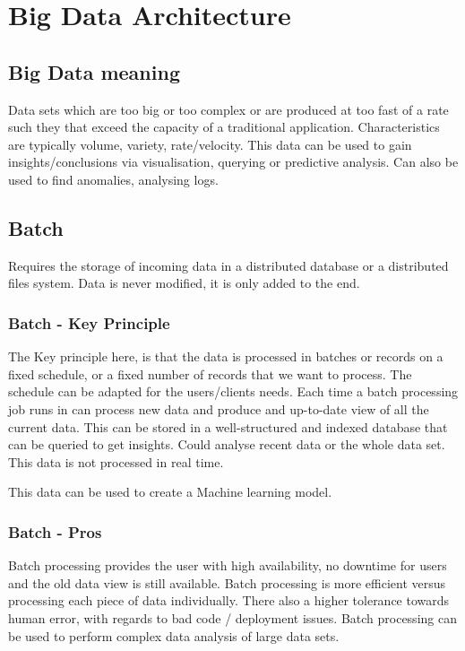 \chapter{Big Data Architecture}

\section{Big Data meaning}
Data sets which are too big or too complex or are produced at too fast of a rate such they that exceed the capacity of a traditional application.
Characteristics are typically volume, variety, rate/velocity.
This data can be used to gain insights/conclusions via visualisation, querying or predictive analysis.
Can also be used to find anomalies, analysing logs.


\section{Batch}
Requires the storage of incoming data in a distributed database or a distributed files system.
Data is never modified, it is only added to the end.

\subsection{Batch - Key Principle}
The Key principle here, is that the data is processed in batches or records on a fixed schedule, or a fixed number of records that we want to process.
The schedule can be adapted for the users/clients needs.
Each time a batch processing job runs in can process new data and produce and up-to-date view of all the current data.
This can be stored in a well-structured and indexed database that can be queried to get insights.
Could analyse recent data or the whole data set.
This data is not processed in real time.

\begin{note}
    This data can be used to create a Machine learning model.
\end{note}

\subsection{Batch - Pros}
Batch processing provides the user with high availability, no downtime for users and the old data view is still available.
Batch processing is more efficient versus processing each piece of data individually.
There also a higher tolerance towards human error, with regards to bad code / deployment issues.
Batch processing can be used to perform complex data analysis of large data sets.

